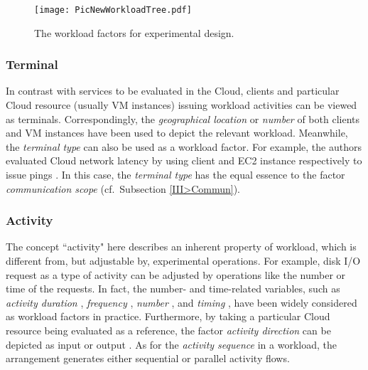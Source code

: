 \documentclass[10pt, conference, compsocconf]{IEEEtran}
\begin{document}
\begin{figure}[!t]
\centering
\texttt{[image: PicNewWorkloadTree.pdf]}
\caption{The workload factors for experimental design.}
\label{fig>PicWorkloadTree}
\end{figure}

\subsubsection{Terminal}
In contrast with services to be evaluated in the Cloud, clients and particular Cloud resource (usually VM instances) issuing workload activities can be viewed as terminals. Correspondingly, the \textit{geographical location} or \textit{number} of both clients \cite{Garfinker_2007} and VM instances \cite{Hill_Li_2010} have been used to depict the relevant workload. Meanwhile, the \textit{terminal type} can also be used as a workload factor. For example, the authors evaluated Cloud network latency by using client and EC2 instance respectively to issue pings \cite{Baun_Kunze_2009}. In this case, the \textit{terminal type} has the equal essence to the factor \textit{communication scope} (cf.~Subsection \ref{III>Commun}).  
\subsubsection{Activity}
The concept ``activity" here describes an inherent property of workload, which is different from, but adjustable by, experimental operations. For example, disk I/O request as a type of activity can be adjusted by operations like the number or time of the requests. In fact, the number- and time-related variables, such as \textit{activity duration} \cite{Garfinker_2007}, \textit{frequency} \cite{Chiu_Agrawal_2010}, \textit{number} \cite{Chiu_Agrawal_2010}, and \textit{timing} \cite{Garfinker_2007a}, have been widely considered as workload factors in practice. Furthermore, by taking a particular Cloud resource being evaluated as a reference, the factor \textit{activity direction} can be depicted as input or output \cite{Baun_Kunze_2009}. As for the \textit{activity sequence} in a workload, the arrangement generates either sequential \cite{Baun_Kunze_2009} or parallel \cite{Hill_Li_2010} activity flows.
\end{document}
